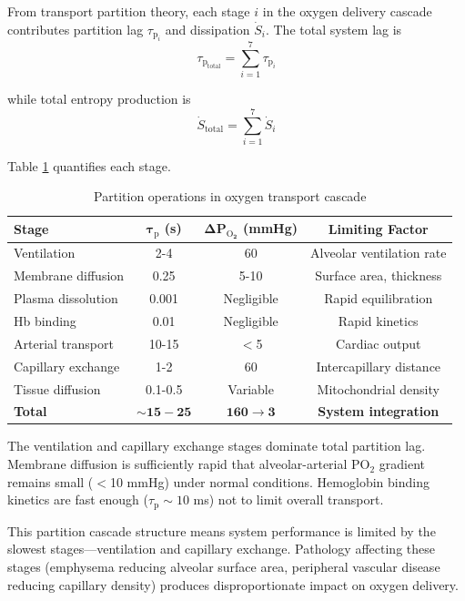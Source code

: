 \documentclass[10pt,twocolumn,a4paper]{article}
\theoremstyle{remark}
\newcommand{\taulag}{\tau_{\mathrm{p}}}
\begin{document}
From transport partition theory, each stage $i$ in the oxygen delivery cascade contributes partition lag $\taulag_{i}$ and dissipation $\dot{S}_{i}$. The total system lag is
\begin{equation}
\taulag_{\mathrm{total}} = \sum_{i=1}^{7} \taulag_{i}
\end{equation}

while total entropy production is
\begin{equation}
\dot{S}_{\mathrm{total}} = \sum_{i=1}^{7} \dot{S}_{i}
\end{equation}

Table \ref{tab:integrated_partition} quantifies each stage.

\begin{table}[h]
\centering
\caption{Partition operations in oxygen transport cascade}
\label{tab:integrated_partition}
\begin{tabular}{lccc}
\toprule
\textbf{Stage} & \textbf{$\boldsymbol{\taulag}$ (s)} & \textbf{$\boldsymbol{\Delta P_{\mathrm{O}_{2}}}$ (mmHg)} & \textbf{Limiting Factor} \\
\midrule
Ventilation & 2-4 & 60 & Alveolar ventilation rate \\
Membrane diffusion & 0.25 & 5-10 & Surface area, thickness \\
Plasma dissolution & 0.001 & Negligible & Rapid equilibration \\
Hb binding & 0.01 & Negligible & Rapid kinetics \\
Arterial transport & 10-15 & $<$5 & Cardiac output \\
Capillary exchange & 1-2 & 60 & Intercapillary distance \\
Tissue diffusion & 0.1-0.5 & Variable & Mitochondrial density \\
\midrule
\textbf{Total} & $\mathbf{\sim 15-25}$ & $\mathbf{160 \to 3}$ & \textbf{System integration} \\
\bottomrule
\end{tabular}
\end{table}

The ventilation and capillary exchange stages dominate total partition lag. Membrane diffusion is sufficiently rapid that alveolar-arterial PO$_{2}$ gradient remains small ($<$10 mmHg) under normal conditions. Hemoglobin binding kinetics are fast enough ($\taulag \sim 10$ ms) not to limit overall transport.

This partition cascade structure means system performance is limited by the slowest stages—ventilation and capillary exchange. Pathology affecting these stages (emphysema reducing alveolar surface area, peripheral vascular disease reducing capillary density) produces disproportionate impact on oxygen delivery.
\end{document}
